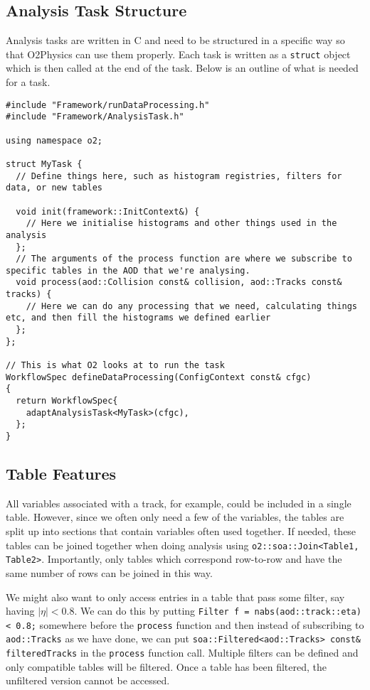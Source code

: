 \subsection{Analysis Task Structure}\label{sec:TaskStructure}
Analysis tasks are written in C\OldTexttt{++} and need to be structured in a specific way so that O2Physics can use them properly. Each task is written as a \texttt{struct} object which is then called at the end of the task. Below is an outline of what is needed for a task.

\begin{verbatim}
#include "Framework/runDataProcessing.h"
#include "Framework/AnalysisTask.h"

using namespace o2;

struct MyTask {
  // Define things here, such as histogram registries, filters for data, or new tables

  void init(framework::InitContext&) {
    // Here we initialise histograms and other things used in the analysis
  };
  // The arguments of the process function are where we subscribe to specific tables in the AOD that we're analysing. 
  void process(aod::Collision const& collision, aod::Tracks const& tracks) {
    // Here we can do any processing that we need, calculating things etc, and then fill the histograms we defined earlier
  };
};

// This is what O2 looks at to run the task
WorkflowSpec defineDataProcessing(ConfigContext const& cfgc)
{
  return WorkflowSpec{
    adaptAnalysisTask<MyTask>(cfgc),
  };
}
\end{verbatim}

\subsection{Table Features}
All variables associated with a track, for example, could be included in a single table. However, since we often only need a few of the variables, the tables are split up into sections that contain variables often used together. If needed, these tables can be joined together when doing analysis using \texttt{o2::soa::Join<Table1, Table2>}. Importantly, only tables which correspond row-to-row and have the same number of rows can be joined in this way.

We might also want to only access entries in a table that pass some filter, say having $|\eta| < 0.8$. We can do this by putting \texttt{Filter f = nabs(aod::track::eta) < 0.8;} somewhere before the \texttt{process} function and then instead of subscribing to \texttt{aod::Tracks} as we have done, we can put \texttt{soa::Filtered<aod::Tracks> const\& filteredTracks} in the \texttt{process} function call. Multiple filters can be defined and only compatible tables will be filtered. Once a table has been filtered, the unfiltered version cannot be accessed. 

